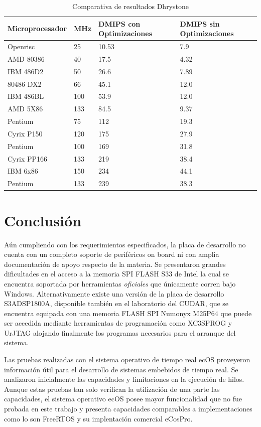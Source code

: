 \begin{table}[h!]
\begin{center}
\begin{tabular}{ |l |l |l |l |}
\hline
\rowcolor[gray]{0.8} Microprocesador& MHz & DMIPS con Optimizaciones & DMIPS sin Optimizaciones \\
\hline
Openrisc		  &25	&10.53	&7.9\\
\hline
AMD 80386         &40   &17.5   &4.32\\
\hline
IBM 486D2         &50   &26.6   &7.89\\
\hline
80486 DX2         &66   &45.1   &12.0\\
\hline
IBM 486BL        &100   &53.9   &12.0\\
\hline
AMD 5X86         &133   &84.5   &9.37\\
\hline
Pentium           &75    &112   &19.3\\
\hline
Cyrix P150       &120    &175   &27.9\\
\hline
Pentium          &100    &169   &31.8\\
\hline
Cyrix PP166      &133    &219   &38.4\\
\hline
IBM 6x86         &150    &234   &44.1\\
\hline
Pentium          &133    &239   &38.3\\
\hline
\end{tabular}
\end{center}
\caption{Comparativa de resultados Dhrystone}
\end{table}

\section{Conclusión}
 Aún cumpliendo con los requerimientos especificados, la placa de desarrollo no cuenta con un completo soporte de periféricos on board ni con amplia
 documentación de apoyo respecto de la materia. Se presentaron grandes dificultades en el acceso a la memoria SPI FLASH S33 de Intel la cual se encuentra soportada por
	herramientas \textit{oficiales} que únicamente corren bajo Windows. Alternativamente existe una versión de la placa de desarrollo S3ADSP1800A,
	disponible también en el laboratorio del CUDAR, que se encuentra equipada con una memoria FLASH SPI Numonyx M25P64 que puede ser accedida mediante
	herramientas de programación como XC3SPROG y UrJTAG alojando finalmente los programas necesarios para el arranque del sistema.
	
	Las pruebas realizadas con el sistema operativo de tiempo real ecOS proveyeron información útil para el desarrollo de sistemas embebidos de tiempo
	real. Se analizaron inicialmente las capacidades y limitaciones en la ejecución de hilos. Aunque estas pruebas tan solo verifican la utilización de
	una parte las capacidades, el sistema operativo ecOS posee mayor funcionalidad que no fue probada en este trabajo y presenta capacidades comparables
	a implementaciones como lo son FreeRTOS y su implentación comercial eCosPro.
	
